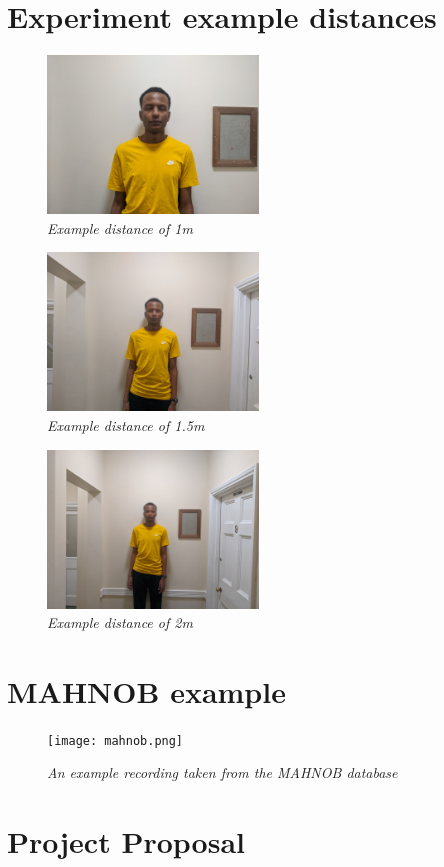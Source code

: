 \documentclass[12pt,twoside,notitlepage]{report}
\begin{document}
\begin{appendices}
\chapter{Experiment example distances}
\label{appendix:experiments}
\begin{figure}[H]
    \centering
    \includegraphics[width=0.5\textwidth]{evaluation/1.jpg}
   \caption{\textit{Example distance of 1m}}
\end{figure}
\begin{figure}[H]
    \centering
    \includegraphics[width=0.5\textwidth]{evaluation/1-5.jpg}
   \caption{\textit{Example distance of 1.5m} }
\end{figure}
\begin{figure}[H]
    \centering
    \includegraphics[width=0.5\textwidth]{evaluation/2.jpg}
    \caption{\textit{Example distance of 2m} }
\end{figure}

\chapter{MAHNOB example}
\begin{figure}[H]
    \centering
    \texttt{[image: mahnob.png]}
    \caption{\textit{An example recording taken from the MAHNOB \cite{Mahnob} database} }
\end{figure}


\cleardoublepage

\chapter{Project Proposal}

    
\end{appendices}
% 
\end{document}
